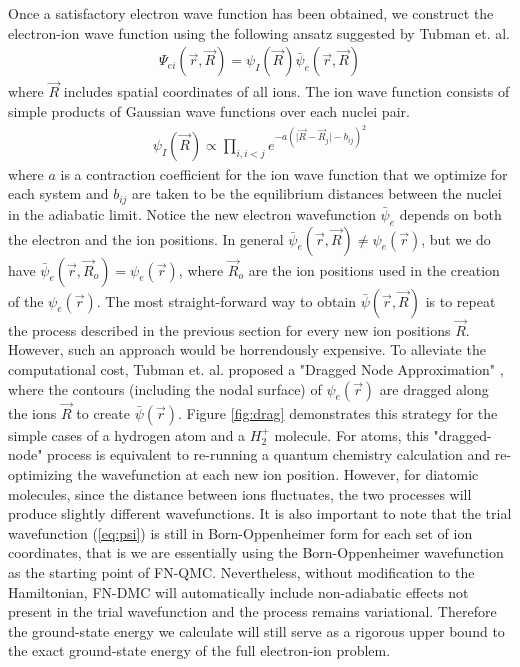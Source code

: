 \documentclass[aps,prl,superscriptaddress,groupedaddress]{revtex4}
\begin{document}
Once a satisfactory electron wave function has been obtained, we construct the electron-ion wave function using the following ansatz suggested by Tubman et. al.\cite{Tubman_ECG}
\begin{align}
\Psi_{ei}(\vec{r},\vec{R})=\psi_I(\vec{R})\bar{\psi}_e(\vec{r},\vec{R}) \label{eq:psi}
\end{align}
where $\vec{R}$ includes spatial coordinates of all ions. The ion wave function consists of simple products of Gaussian wave functions over each nuclei pair.
\begin{align}
\psi_I(\vec{R})\propto \prod\limits_{i,i<j}e^{-a(\vert \vec{R}-\vec{R}_j\vert-b_{ij})^2}
\end{align}
where $a$ is a contraction coefficient for the ion wave function that we optimize for each system and $b_{ij}$ are taken to be the equilibrium distances between the nuclei in the adiabatic limit. Notice the new electron wavefunction $\bar{\psi}_e$ depends on both the electron and the ion positions. In general $\bar{\psi}_e(\vec{r},\vec{R})\neq\psi_e(\vec{r})$, but we do have $\bar{\psi}_e(\vec{r},\vec{R}_o)=\psi_e(\vec{r})$, where $\vec{R}_o$ are the ion positions used in the creation of the $\psi_e(\vec{r})$. The most straight-forward way to obtain $\bar{\psi}(\vec{r},\vec{R})$ is to repeat the process described in the previous section for every new ion positions $\vec{R}$. However, such an approach would be horrendously expensive. To alleviate the computational cost, Tubman et. al. proposed a "Dragged Node Approximation" \cite{Tubman_ECG}, where the contours (including the nodal surface) of $\psi_e(\vec{r})$ are dragged along the ions $\vec{R}$ to create $\bar{\psi}(\vec{r})$. Figure \ref{fig:drag} demonstrates this strategy for the simple cases of a hydrogen atom and a $H_2^+$ molecule. For atoms, this "dragged-node" process is equivalent to re-running a quantum chemistry calculation and re-optimizing the wavefunction at each new ion position. However, for diatomic molecules, since the distance between ions fluctuates, the two processes will produce slightly different wavefunctions. It is also important to note that the trial wavefunction (\ref{eq:psi}) is still in Born-Oppenheimer form for each set of ion coordinates, that is we are essentially using the Born-Oppenheimer wavefunction as the starting point of FN-QMC. Nevertheless, without modification to the Hamiltonian, FN-DMC will automatically include non-adiabatic effects not present in the trial wavefunction and the process remains variational. Therefore the ground-state energy we calculate will still serve as a rigorous upper bound to the exact ground-state energy of the full electron-ion problem.
\end{document}
